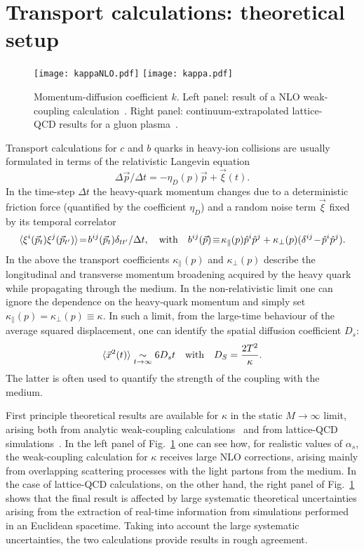 \documentclass{PoS}
\newcommand{\beq}{\begin{equation}}
\newcommand{\eeq}{\end{equation}}
\def\kk{{\kappa}}
\def\pp{{\hat{p}}}
\begin{document}
\section{Transport calculations: theoretical setup}
\begin{figure}[!ht]
\begin{center}
\texttt{[image: kappaNLO.pdf]}
\texttt{[image: kappa.pdf]}
\caption{Momentum-diffusion coefficient $k$. Left panel: result of a NLO weak-coupling calculation~\cite{CaronHuot:2008uh}. Right panel: continuum-extrapolated lattice-QCD results for a gluon plasma~\cite{Francis:2015daa}.}\label{fig:transp-coeff} 
\end{center}
\end{figure}
Transport calculations for $c$ and $b$ quarks in heavy-ion collisions are usually formulated in terms of the relativistic Langevin equation~\cite{Moore:2004tg,Alberico:2011zy,He:2013zua}
\beq
{\Delta \vec{p}}/{\Delta t}=-{\eta_D(p)\vec{p}}+{\vec\xi(t)}.\label{eq:Langevin}
\eeq
In the time-step $\Delta t$ the heavy-quark momentum changes due to a deterministic friction force (quantified by the coefficient $\eta_D$) and a random noise term $\vec\xi$ fixed by its temporal correlator
\beq
\langle\xi^i(\vec p_t)\xi^j(\vec p_{t'})\rangle\!=\!{b^{ij}(\vec p_t)}{\delta_{tt'}}/{\Delta t},\quad{\rm with}\quad{b^{ij}(\vec p)}\!\equiv\!{\kk_\|(p)}\pp^i\pp^j+{\kk_\perp(p)}(\delta^{ij}\!-\!\pp^i\pp^j).
\eeq
In the above the transport coefficients $\kk_\|(p)$ and $\kk_\perp(p)$ describe the longitudinal and transverse momentum broadening acquired by the heavy quark while propagating through the medium. In the non-relativistic limit one can ignore the dependence on the heavy-quark momentum and simply set $\kk_\|(p)\!=\!\kk_\perp(p)\!\equiv\!\kappa$. In such a limit, from the large-time behaviour of the average squared displacement, one can identify the spatial diffusion coefficient $D_s$:
\beq
\langle\vec x^2(t)\rangle\underset{t\to\infty}{\sim}6{D_s}t\quad{\rm with}\quad {D_S=\frac{2T^2}{\kappa}}.\label{eq:Ds}
\eeq
The latter is often used to quantify the strength of the coupling with the medium. 

First principle theoretical results are available for $\kappa$ in the static $M\!\to\!\infty$ limit, arising both from analytic weak-coupling calculations~\cite{CaronHuot:2008uh} and from lattice-QCD simulations~\cite{Francis:2015daa}. In the left panel of Fig.~\ref{fig:transp-coeff} one can see how, for realistic values of $\alpha_s$, the weak-coupling calculation for $\kappa$ receives large NLO corrections, arising mainly from overlapping scattering processes with the light partons from the medium. In the case of lattice-QCD calculations, on the other hand, the right panel of Fig.~\ref{fig:transp-coeff} shows that the final result is affected by large systematic theoretical uncertainties arising from the extraction of real-time information from simulations performed in an Euclidean spacetime. Taking into account the large systematic uncertainties, the two calculations provide results in rough agreement.
\end{document}
